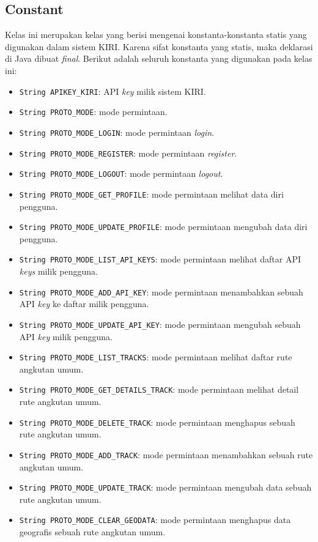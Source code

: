 \subsection{Constant}
\label{sec:constant}
Kelas ini merupakan kelas yang berisi mengenai konstanta-konstanta statis yang digunakan dalam sistem KIRI. Karena sifat konstanta yang statis, maka deklarasi di Java dibuat \textit{final}. Berikut adalah seluruh konstanta yang digunakan pada kelas ini:
\begin{itemize}
	\item \texttt{String APIKEY\_KIRI}: API \textit{key} milik sistem KIRI.
	\item \texttt{String PROTO\_MODE}: mode permintaan.
	\item \texttt{String PROTO\_MODE\_LOGIN}: mode permintaan \textit{login}.
	\item \texttt{String PROTO\_MODE\_REGISTER}: mode permintaan \textit{register}.
	\item \texttt{String PROTO\_MODE\_LOGOUT}: mode permintaan \textit{logout}.
	\item \texttt{String PROTO\_MODE\_GET\_PROFILE}: mode permintaan melihat data diri pengguna.
	\item \texttt{String PROTO\_MODE\_UPDATE\_PROFILE}: mode permintaan mengubah data diri pengguna.
	\item \texttt{String PROTO\_MODE\_LIST\_API\_KEYS}: mode permintaan melihat daftar API \textit{keys} milik pengguna.
	\item \texttt{String PROTO\_MODE\_ADD\_API\_KEY}: mode permintaan menambahkan sebuah API \textit{key} ke daftar milik pengguna.
	\item \texttt{String PROTO\_MODE\_UPDATE\_API\_KEY}: mode permintaan mengubah sebuah API \textit{key} milik pengguna.
	\item \texttt{String PROTO\_MODE\_LIST\_TRACKS}: mode permintaan melihat daftar rute angkutan umum.
	\item \texttt{String PROTO\_MODE\_GET\_DETAILS\_TRACK}: mode permintaan melihat detail rute angkutan umum.
	\item \texttt{String PROTO\_MODE\_DELETE\_TRACK}: mode permintaan menghapus sebuah rute angkutan umum.
	\item \texttt{String PROTO\_MODE\_ADD\_TRACK}: mode permintaan menambahkan sebuah rute angkutan umum.
	\item \texttt{String PROTO\_MODE\_UPDATE\_TRACK}: mode permintaan mengubah data sebuah rute angkutan umum.
	\item \texttt{String PROTO\_MODE\_CLEAR\_GEODATA}: mode permintaan menghapus data geografis sebuah rute angkutan umum.

\end{itemize}
